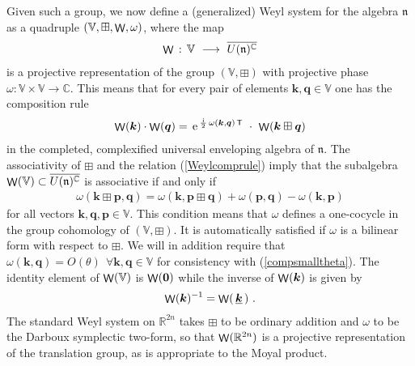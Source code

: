 \documentclass[11pt,a4paper]{article}
\DeclareMathOperator{\weyl}{{\sf W}}                   %
\newcommand{\comp}{\boxplus}                            %
\newcommand{\1}{\mathbb{1}}
\newcommand{\mbf}[1]{{\boldsymbol {#1} }}
\def\ii{{\,{\rm i}\,}}
\def\T{{\sf T}}
\def\mk{{\mbf k}}
\def\mq{{\mbf q}}
\def\mfn{{\mathfrak n}}
\def\mbbV{{\mathbb V}}
\newcommand{\complex}{{\mathbb C}} %
\newcommand{\real}{{\mathbb R}} %
\def\e{{\,\rm e}\,}
\newcommand{\beq}{\begin{eqnarray}}
\newcommand{\eeq}{\end{eqnarray}}
\begin{document}
Given such a group, we now define a (generalized) Weyl system for the
algebra $\mfn$ as a quadruple
$(\mathbb{V},\comp,\weyl,\omega)$, where the map
\beq
\weyl\,:\,\mathbb{V}~\longrightarrow~\overline{U(\mfn)^\complex}
\label{genweylmapdef}\eeq
is a projective representation of the group
$(\mathbb{V},\comp)$ with projective phase
$\omega:\mathbb{V}\times\mathbb{V}\to\complex$. This means that for
every pair of elements $\mk,\mq\in\mathbb{V}$ one has the composition
rule
\beq
\weyl(\mk)\cdot\weyl(\mq)=\e^{\frac\ii2\,\omega(\mk,\mq)\,\T}~\cdot~
\weyl(\mk\comp\mq)
\label{Weylcomprule}\eeq
in the completed, complexified universal enveloping algebra of
$\mfn$. The associativity of $\comp$ and the relation
(\ref{Weylcomprule}) imply that the subalgebra
$\weyl(\mathbb{V})\subset\overline{U(\mfn)^\complex}$ is
associative if and only if
\beq
\omega(\mk\comp\mbf p,\mq)=\omega(\mk,\mbf p\comp\mq)+\omega(\mbf p,\mq)-
\omega(\mk,\mbf p)
\label{cocyclecond}\eeq
for all vectors $\mk,\mq,\mbf p\in\mbbV$. This condition means that
$\omega$ defines a one-cocycle in the group cohomology
of $(\mathbb{V},\comp)$. It is automatically satisfied if
$\omega$ is a bilinear form with respect to $\comp$. We will in
addition require that $\omega(\mk,\mq)=O(\theta)~~\forall
\mk,\mq\in\mathbb{V}$ for consistency with
(\ref{compsmalltheta}). The identity element of $\weyl(\mathbb{V})$
is $\weyl(\mbf0)$ while the inverse of $\weyl(\mk)$ is given by
\beq
\weyl(\mk)^{-1}=\weyl(\,\underline{\mk}\,) \ .
\label{weylinverse}\eeq
The standard Weyl system on $\real^{2n}$ takes $\comp$ to be ordinary
addition and $\omega$ to be the Darboux symplectic two-form, so that
$\weyl(\real^{2n})$ is a projective representation of the translation
group, as is appropriate to the Moyal product.
\end{document}
